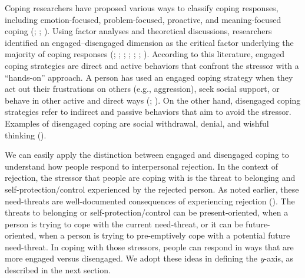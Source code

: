 \documentclass[
]{udthesis}
\begin{document}
Coping researchers have proposed various ways to classify coping
responses, including emotion-focused, problem-focused, proactive, and
meaning-focused coping (; ; ). Using factor analyses and
theoretical discussions, researchers identified an engaged--disengaged
dimension as the critical factor underlying the majority of coping
responses (; ; ; ; ; ; ). According to this literature,
engaged coping strategies are direct and active behaviors that confront
the stressor with a ``hands-on'' approach. A person has used an engaged
coping strategy when they act out their frustrations on others (e.g.,
aggression), seek social support, or behave in other active and direct
ways (; ). On the other hand, disengaged
coping strategies refer to indirect and passive behaviors that aim to
avoid the stressor. Examples of disengaged coping are social withdrawal,
denial, and wishful thinking ().

We can easily apply the distinction between engaged and disengaged
coping to understand how people respond to interpersonal rejection. In
the context of rejection, the stressor that people are coping with is
the threat to belonging and self-protection/control experienced by the
rejected person. As noted earlier, these need-threats are
well-documented consequences of experiencing rejection
(). The threats to belonging or
self-protection/control can be present-oriented, when a person is trying
to cope with the current need-threat, or it can be future-oriented, when
a person is trying to pre-emptively cope with a potential future
need-threat. In coping with those stressors, people can respond in ways
that are more engaged versus disengaged. We adopt these ideas in
defining the \emph{y}-axis, as described in the next section.
\end{document}

